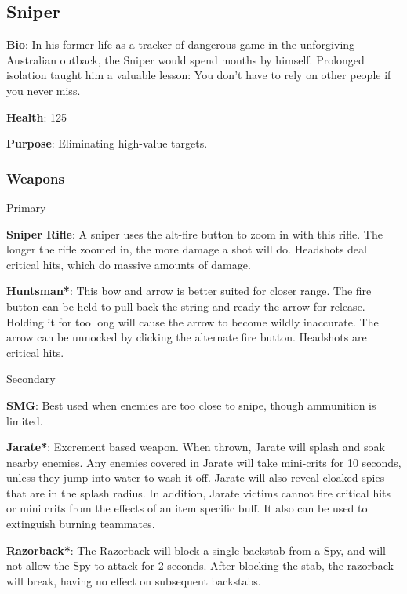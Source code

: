 \subsection{Sniper}
\label{Sniper}
{\bf Bio}:
In his former life as a tracker of dangerous game in the unforgiving Australian outback, the Sniper would spend months by himself. Prolonged isolation taught him a valuable lesson: You don't have to rely on other people if you never miss.

{\bf Health}: 125

{\bf Purpose}:
Eliminating high-value targets.

\subsubsection {Weapons}

\begin {center}
\underline {Primary}
\end {center}

{\bf Sniper Rifle}: A sniper uses the alt-fire button to zoom in with this rifle. The longer the rifle zoomed in, the more damage a shot will do. Headshots deal critical hits, which do massive amounts of damage.

{\bf Huntsman*}: This bow and arrow is better suited for closer range. The fire button can be held to pull back the string and ready the arrow for release. Holding it for too long will cause the arrow to become wildly inaccurate. The arrow can be unnocked by clicking the alternate fire button. Headshots are critical hits.

\begin {center}
\underline {Secondary}
\end {center}

{\bf SMG}: Best used when enemies are too close to snipe, though ammunition is limited.

{\bf Jarate*}: Excrement based weapon. When thrown, Jarate will splash and soak nearby enemies. Any enemies covered in Jarate will take mini-crits for 10 seconds, unless they jump into water to wash it off. Jarate will also reveal cloaked spies that are in the splash radius. In addition, Jarate victims cannot fire critical hits or mini crits from the effects of an item specific buff. It also can be used to extinguish burning teammates. 

{\bf Razorback*}: The Razorback will block a single backstab from a Spy, and will not allow the Spy to attack for 2 seconds. After blocking the stab, the razorback will break, having no effect on subsequent backstabs.

